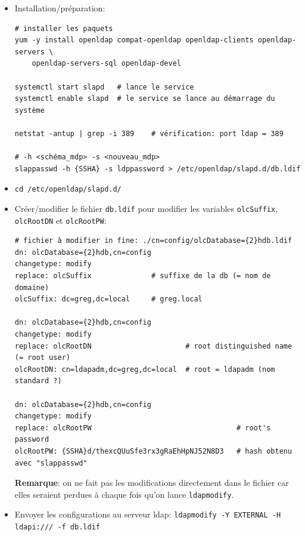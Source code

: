 \documentclass[a4paper]{article}
\begin{document}
\begin{itemize}


\item Installation/préparation:
\begin{example} \begin{verbatim}
# installer les paquets
yum -y install openldap compat-openldap openldap-clients openldap-servers \
    openldap-servers-sql openldap-devel

systemctl start slapd   # lance le service
systemctl enable slapd  # le service se lance au démarrage du système

netstat -antup | grep -i 389    # vérification: port ldap = 389

# -h <schéma_mdp> -s <nouveau_mdp>
slappasswd -h {SSHA} -s ldppassword > /etc/openldap/slapd.d/db.ldif
\end{verbatim} \end{example}


\item \texttt{cd /etc/openldap/slapd.d/}


\item Créer/modifier le fichier \texttt{db.ldif} pour modifier les variables \texttt{olcSuffix}, \texttt{olcRootDN} et \texttt{olcRootPW}:
\begin{example} \begin{verbatim}
# fichier à modifier in fine: ./cn=config/olcDatabase={2}hdb.ldif
dn: olcDatabase={2}hdb,cn=config
changetype: modify
replace: olcSuffix              # suffixe de la db (= nom de domaine)
olcSuffix: dc=greg,dc=local     # greg.local

dn: olcDatabase={2}hdb,cn=config
changetype: modify
replace: olcRootDN                      # root distinguished name (= root user)
olcRootDN: cn=ldapadm,dc=greg,dc=local  # root = ldapadm (nom standard ?)

dn: olcDatabase={2}hdb,cn=config
changetype: modify
replace: olcRootPW                                  # root's password
olcRootPW: {SSHA}d/thexcQUuSfe3rx3gRaEhHpNJ52N8D3   # hash obtenu avec "slappasswd"
\end{verbatim} \end{example}
\textbf{Remarque}: on ne fait pas les modifications directement dans le fichier car elles seraient perdues à chaque fois qu'on lance \texttt{ldapmodify}.


\item Envoyer les configurations au serveur ldap: \texttt{ldapmodify -Y EXTERNAL  -H ldapi:/// -f db.ldif}



\end{itemize}
\end{document}
